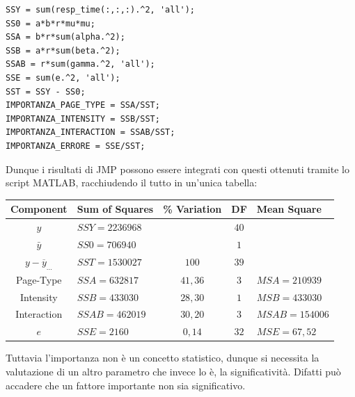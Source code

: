 \begin{verbatim}
SSY = sum(resp_time(:,:,:).^2, 'all');
SS0 = a*b*r*mu*mu;
SSA = b*r*sum(alpha.^2);
SSB = a*r*sum(beta.^2);
SSAB = r*sum(gamma.^2, 'all');
SSE = sum(e.^2, 'all');
SST = SSY - SS0;
IMPORTANZA_PAGE_TYPE = SSA/SST;
IMPORTANZA_INTENSITY = SSB/SST;
IMPORTANZA_INTERACTION = SSAB/SST;
IMPORTANZA_ERRORE = SSE/SST;
\end{verbatim}
Dunque i risultati di JMP possono essere integrati con questi ottenuti tramite lo script MATLAB, racchiudendo il tutto in un'unica tabella:
\begin{table}[H]
	\begin{center}
		\begin{tabular}{|c|l|c|c|l|}
			\hline
		\textbf{Component} & \textbf{Sum of Squares} & \textbf{\% Variation} & \textbf{DF} & \textbf{Mean Square} \\
		\hline
		$y$ & $SSY=2236968$ & & $40$ &  \\
		$\bar{y}$ & $SS0 = 706940$ & & $1$ & \\
		$y-\overline{y}_{...}$ & $SST = 1530027$ & $100$ & $39$ & \\
		Page-Type & $SSA = 632817$ & $41,36$ & $3$ & $MSA = 210939$ \\
		Intensity & $SSB = 433030$ & $28,30$ & $1$ & $MSB = 433030$ \\
		Interaction & $SSAB = 462019$ & $30,20$ & $3$ & $MSAB = 154006$ \\
		$e$ & $SSE = 2160$ & $0,14$ & $32$ & $MSE = 67,52$ \\
		\hline
		\end{tabular}
	\end{center}
\end{table}
Tuttavia l'importanza non è un concetto statistico, dunque si necessita la valutazione di un altro parametro che invece lo è, la significatività.
Difatti può accadere che un fattore importante non sia significativo.
